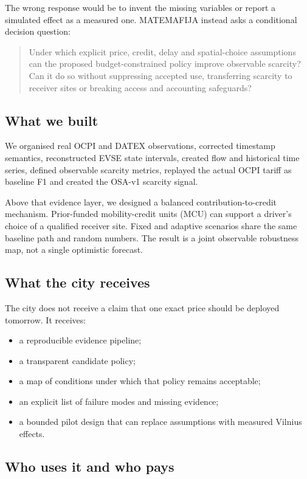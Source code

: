 \documentclass[11pt,a4paper]{article}
\begin{document}
The wrong response would be to invent the missing variables or report a simulated effect as a measured one. MATEMAFIJA instead asks a conditional decision question:

\begin{quote}
Under which explicit price, credit, delay and spatial-choice assumptions can the proposed budget-constrained policy improve observable scarcity? Can it do so without suppressing accepted use, transferring scarcity to receiver sites or breaking access and accounting safeguards?
\end{quote}

\subsection{What we built}

We organised real OCPI and DATEX observations, corrected timestamp semantics, reconstructed EVSE state intervals, created flow and historical time series, defined observable scarcity metrics, replayed the actual OCPI tariff as baseline F1 and created the OSA-v1 scarcity signal.

Above that evidence layer, we designed a balanced contribution-to-credit mechanism. Prior-funded mobility-credit units (MCU) can support a driver's choice of a qualified receiver site. Fixed and adaptive scenarios share the same baseline path and random numbers. The result is a joint observable robustness map, not a single optimistic forecast.

\subsection{What the city receives}

The city does not receive a claim that one exact price should be deployed tomorrow. It receives:
\begin{itemize}
\item a reproducible evidence pipeline;
\item a transparent candidate policy;
\item a map of conditions under which that policy remains acceptable;
\item an explicit list of failure modes and missing evidence;
\item a bounded pilot design that can replace assumptions with measured Vilnius effects.
\end{itemize}

\subsection{Who uses it and who pays}
\end{document}
